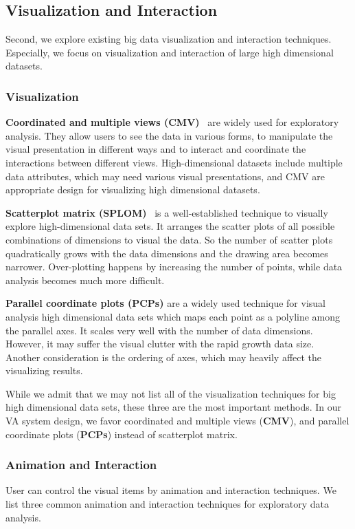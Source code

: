 \documentclass[journal]{vgtc}                %
\begin{document}
{\subsection{Visualization and Interaction}
Second, we explore existing big data visualization and interaction techniques. Especially, we focus on visualization and  interaction of large high dimensional datasets.

\subsubsection{Visualization}
\textbf{Coordinated and multiple views (CMV)}~\cite{roberts2007state} are widely used for exploratory analysis. They allow users to see the data in various forms, to manipulate the visual presentation in different ways and to interact and coordinate the interactions between different views.  High-dimensional datasets include multiple data attributes, which may need various visual presentations, and CMV are appropriate design for visualizing high dimensional datasets.

\textbf{Scatterplot matrix (SPLOM)}~\cite{elmqvist2008rolling} is a well-established technique to visually explore high-dimensional data sets. It arranges the scatter plots of all possible combinations of dimensions to visual the data. So the number of scatter plots quadratically grows with the data dimensions and the drawing area becomes narrower. Over-plotting happens by increasing the number of points, while data analysis becomes much more difficult.


\textbf{Parallel coordinate plots (PCPs)} are a widely used technique for visual analysis high dimensional data sets which maps each point as a polyline among the parallel axes. It scales very well with the number of data dimensions. However, it may suffer the visual clutter with the rapid growth data size. Another consideration is the ordering of axes, which may heavily affect the visualizing results.

While we admit that we may not list all of the visualization techniques for big high dimensional data sets, these three are the most important methods. In our VA system design,  we favor coordinated and multiple views (\textbf{CMV}), and parallel coordinate plots (\textbf{PCPs}) instead of scatterplot matrix. 

\subsubsection{Animation and Interaction}
User can control the visual items by animation and interaction techniques. We list three common animation and interaction techniques for exploratory data analysis.

}
\end{document}
